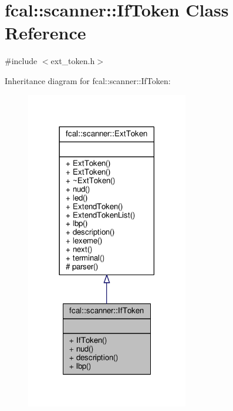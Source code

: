 \hypertarget{classfcal_1_1scanner_1_1IfToken}{}\section{fcal\+:\+:scanner\+:\+:If\+Token Class Reference}
\label{classfcal_1_1scanner_1_1IfToken}


{\ttfamily \#include $<$ext\+\_\+token.\+h$>$}



Inheritance diagram for fcal\+:\+:scanner\+:\+:If\+Token\+:
\nopagebreak
\begin{figure}[H]
\begin{center}
\leavevmode
\includegraphics[width=201pt]{classfcal_1_1scanner_1_1IfToken__inherit__graph}
\end{center}
\end{figure}


